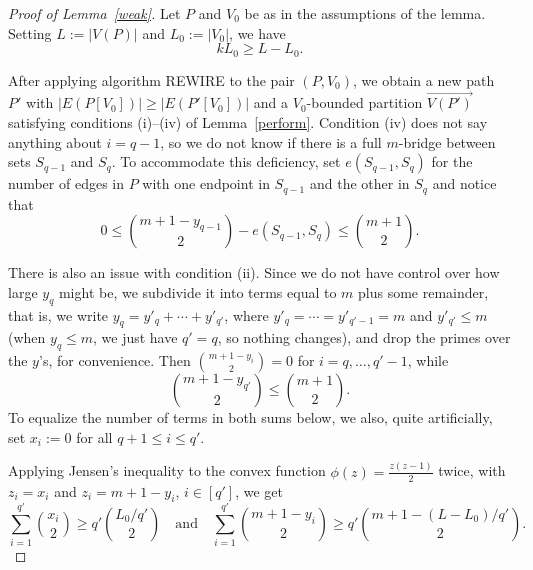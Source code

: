 \documentclass[10pt,a4paper]{amsart}
\begin{document}
\begin{proof}[Proof of Lemma~\ref{weak}] Let $P$ and $V_0$ be as in the assumptions of the lemma. Setting $L:=|V(P)|$ and $L_0:=|V_0|$, we have
\begin{equation}\label{eq:largest_color}
    k L_0 \ge L - L_0.
\end{equation}

After applying algorithm REWIRE to the pair $(P,V_0)$, we obtain a new path $P'$ with $|E(P[V_0])| \geq |E(P'[V_0])|$ and a $V_0$-bounded partition $\overrightarrow{V(P')}$ satisfying conditions (i)--(iv) of Lemma~\ref{perform}. Condition (iv) does not say anything about $i=q-1$, so we do not know if there is a full $m$-bridge between sets $S_{q-1}$ and $S_q$. To accommodate this deficiency, set $e(S_{q-1},S_q)$ for the number of edges in $P$ with one endpoint in $S_{q-1}$ and the other in $S_q$ and notice that
\begin{equation}\label{lastbridge}
0\le{m+1-y_{q-1}\choose 2}-e(S_{q-1},S_q)\le\binom{m+1}2.
\end{equation}

There is also an issue with condition (ii). Since  we do not have control over how large $y_q$ might be, we subdivide it into terms equal to $m$ plus some remainder, that is, we write
$y_q=y'_q+\cdots+ y'_{q'}$, where $y'_q=\cdots=y'_{q'-1}=m$ and $y'_{q'}\le m$ (when $y_q\le m$, we just have $q'=q$, so nothing changes), and drop the primes over the $y$'s, for convenience. Then ${m+1-y_{i}\choose 2}=0$ for $i=q,\dots, q'-1$, while
\begin{equation}\label{lasty}
{m+1-y_{q'}\choose 2}\le\binom{m+1}2.
\end{equation}
To equalize the number of terms in both sums below, we also, quite artificially, set $x_i:=0$ for all $q+1\le i\le q'$.


 Applying Jensen's inequality to the convex function $\phi(z) = \frac{z(z-1)}{2}$ twice,  with $z_i=x_i$ and $z_i=m+1-y_i$, $i\in[q']$,
 we get
 \begin{equation}\label{Jensen}
 \sum_{i=1}^{q'} {x_i \choose 2}\ge q'{L_0/q' \choose 2}\quad\mbox{and}\quad\sum_{i=1}^{q'} {m+1-y_i\choose 2}\geq q'{m+1-(L-L_0)/q' \choose 2}.
 \end{equation}


\end{proof}
\end{document}

